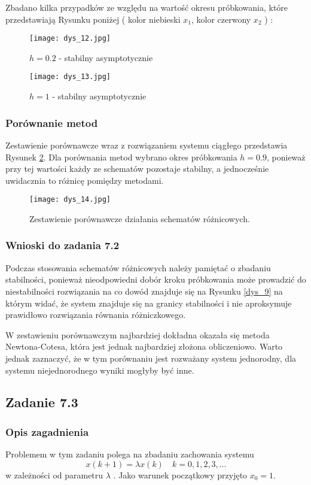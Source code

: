 \documentclass[a4paper,11pt]{article}
\begin{document}
Zbadano kilka przypadków ze względu na wartość okresu próbkowania, które przedstawiają Rysunku poniżej ( kolor niebieski \( x_{1} \), kolor czerwony \(x_{2}\) ) : 
\begin{figure}[!htb]
  \texttt{[image: dys\_12.jpg]}
  \caption{\(h=0.2\) - stabilny asymptotycznie }\label{fig:dys_12}
\endminipage\hfill
{}

  \texttt{[image: dys\_13.jpg]}
  \caption{\(h=1\) - stabilny asymptotycznie}\label{fig:dys_13}

\endminipage
\end{figure}
\subsubsection{Porównanie metod}
Zestawienie porównawcze wraz z rozwiązaniem systemu ciągłego przedstawia Rysunek \ref{fig:dys_14}. Dla porównania metod wybrano okres próbkowania \(h = 0.9 \), ponieważ przy tej wartości każdy ze schematów pozostaje stabilny, a jednocześnie uwidacznia to różnicę pomiędzy metodami.


\begin{figure}[H]
\centerline{\texttt{[image: dys\_14.jpg]}}
\caption{Zestawienie porównawcze działania schematów różnicowych.}
\label{fig:dys_14}
\end{figure}
 

\subsubsection{Wnioski do zadania 7.2}
Podczas stosowania schematów różnicowych należy pamiętać o zbadaniu stabilności, ponieważ nieodpowiedni dobór kroku próbkowania może prowadzić do niestabilności rozwiązania na co dowód znajduje się na Rysunku \ref{dys_9} na którym widać, że system znajduje się na granicy stabilności i nie aproksymuje prawidłowo rozwiązania równania różniczkowego.

W zestawieniu porównawczym najbardziej dokładna okazała się metoda Newtona-Cotesa, która jest jednak najbardziej złożona obliczeniowo. Warto jednak zaznaczyć, że w tym porównaniu jest rozważany system jednorodny, dla systemu niejednorodnego wyniki mogłyby być inne. 


\subsection{Zadanie 7.3}
\subsubsection{Opis zagadnienia}
Problemem w tym zadaniu polega na zbadaniu zachowania systemu 
\begin{equation*}
x(k+1) = \lambda x(k) \quad k=0,1,2,3, \dots
\end{equation*}
w zależności od parametru \( \lambda \) .
Jako warunek początkowy przyjęto \( x_{0} = 1 \). 
\end{document}
